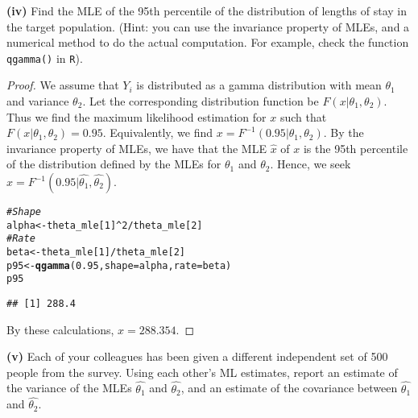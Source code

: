 \documentclass[letterpaper, 12pt]{article}\usepackage[]{graphicx}\usepackage[]{color}
\makeatletter
\newcommand{\hlnum}[1]{\textcolor[rgb]{0.686,0.059,0.569}{#1}}%
\newcommand{\hlcom}[1]{\textcolor[rgb]{0.678,0.584,0.686}{\textit{#1}}}%
\newcommand{\hlopt}[1]{\textcolor[rgb]{0,0,0}{#1}}%
\newcommand{\hlstd}[1]{\textcolor[rgb]{0.345,0.345,0.345}{#1}}%
\newcommand{\hlkwb}[1]{\textcolor[rgb]{0.69,0.353,0.396}{#1}}%
\newcommand{\hlkwc}[1]{\textcolor[rgb]{0.333,0.667,0.333}{#1}}%
\newcommand{\hlkwd}[1]{\textcolor[rgb]{0.737,0.353,0.396}{\textbf{#1}}}%
\newenvironment{kframe}{%
 \def\at@end@of@kframe{}%
 \ifinner\ifhmode%
  \def\at@end@of@kframe{\end{minipage}}%
  \begin{minipage}{\columnwidth}%
 \fi\fi%
 \def\FrameCommand##1{\hskip\@totalleftmargin \hskip-\fboxsep
 \colorbox{shadecolor}{##1}\hskip-\fboxsep
     \hskip-\linewidth \hskip-\@totalleftmargin \hskip\columnwidth}%
 \MakeFramed {\advance\hsize-\width
   \@totalleftmargin\z@ \linewidth\hsize
   \@setminipage}}%
 {\par\unskip\endMakeFramed%
 \at@end@of@kframe}
\newenvironment{knitrout}{}{} %
\makeatother
\begin{document}
\textbf{(iv)}
Find the MLE of the 95th percentile of the
distribution of lengths of stay in the target population. (Hint: you can use
the invariance property of MLEs, and a numerical method to do the actual
computation. For example, check the function
\texttt{qgamma()} in \texttt{R}).
\begin{proof}
We assume that $Y_i$ is distributed as a gamma distribution with mean $\theta_1$ and variance $\theta_2$. Let the corresponding distribution function be $F(x | \theta_1, \theta_2)$. Thus we find the maximum likelihood estimation for $x$ such that $F(x|\theta_1, \theta_2) = 0.95$. Equivalently, we find $x = F^{-1}(0.95 | \theta_1, \theta_2)$. By the invariance property of MLEs, we have that the MLE $\hat{x}$ of $x$ is the 95th percentile of the distribution defined by the MLEs for $\theta_1$ and $\theta_2$. Hence, we seek $\hat{x}=F^{-1}(0.95|\hat{\theta_1}, \hat{\theta_2})$.

\begin{knitrout}
\color{fgcolor}\begin{kframe}
\begin{alltt}
\hlcom{# Shape}
\hlstd{alpha} \hlkwb{<-} \hlstd{theta_mle[}\hlnum{1}\hlstd{]}\hlopt{^}\hlnum{2}\hlopt{/}\hlstd{theta_mle[}\hlnum{2}\hlstd{]}
\hlcom{# Rate}
\hlstd{beta} \hlkwb{<-} \hlstd{theta_mle[}\hlnum{1}\hlstd{]}\hlopt{/}\hlstd{theta_mle[}\hlnum{2}\hlstd{]}
\hlstd{p95} \hlkwb{<-} \hlkwd{qgamma}\hlstd{(}\hlnum{0.95}\hlstd{,} \hlkwc{shape} \hlstd{= alpha,} \hlkwc{rate} \hlstd{= beta)}
\hlstd{p95}
\end{alltt}
\begin{verbatim}
## [1] 288.4
\end{verbatim}
\end{kframe}
\end{knitrout}



By these calculations, $\hat{x} = 288.354$.
\end{proof}
\textbf{(v)}
Each of your colleagues has been given a different independent set of 500 people from the survey. Using each other's ML estimates, report         an estimate of the variance of the MLEs $\hat{\theta_1}$ and $\hat{\theta_2}$, and an estimate of the covariance between $\hat{\theta_1}$ and $\hat{\theta_2}$.
\end{document}
